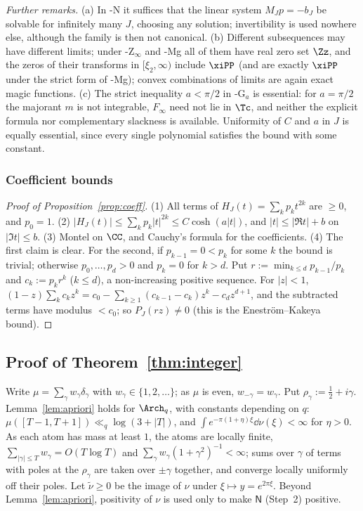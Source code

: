 \emph{Further remarks.} (a) In \hyp{N} it suffices that the linear system $M_Jp=-b_J$ be solvable for infinitely many
$J$, choosing any solution; invertibility is used nowhere else, although the family is then not canonical.
(b) Different subsequences may have different limits; under \hyp{Z$_\infty$} and \hyp{Mg} all of them have real zero set $\Zz$,
and the zeros of their transforms in $[\xi_2,\infty)$ include $\xiPP$ (and are exactly $\xiPP$ under the strict form of \hyp{Mg});
convex combinations of limits are again exact magic functions.
(c) The strict inequality $a<\pi/2$ in \hyp{G$_a$} is essential: for $a=\pi/2$ the majorant $m$ is not integrable, $F_\infty$
need not lie in $\Tc$, and neither the explicit formula nor complementary slackness is available. Uniformity of $C$ and $a$
in $J$ is equally essential, since every single polynomial satisfies the bound with some constant.

\subsubsection{Coefficient bounds}\label{app:proofs-zeroside}
\begin{proof}[Proof of Proposition~\textup{\ref{prop:coeff}}]
(1) All terms of $H_J(t)=\sum_kp_kt^{2k}$ are $\ge0$, and $p_0=1$. (2) $\lvert H_J(t)\rvert\le\sum_kp_k\lvert t\rvert^{2k}\le
C\cosh(a\lvert t\rvert)$, and $\lvert t\rvert\le\lvert\Re t\rvert+b$ on $\lvert\Im t\rvert\le b$. (3) Montel on $\CC$, and Cauchy's formula
for the coefficients. (4) The first claim is clear. For the second, if $p_{k-1}=0<p_k$ for some $k$ the bound is
trivial; otherwise $p_0,\dots,p_d>0$ and $p_k=0$ for $k>d$. Put $r:=\min_{k\le d}p_{k-1}/p_k$ and $c_k:=p_kr^k$
($k\le d$), a non-increasing positive sequence. For $\lvert z\rvert<1$,
$(1-z)\sum_kc_kz^k=c_0-\sum_{k\ge1}(c_{k-1}-c_k)z^k-c_dz^{d+1}$, and the subtracted terms have modulus
$<c_0$; so $P_J(rz)\ne0$ (this is the Enestr\"om--Kakeya bound).
\end{proof}

\subsection{Proof of Theorem~\ref{thm:integer}}\label{app:proofs-integer}

Write $\mu=\sum_\gamma w_\gamma\delta_\gamma$ with $w_\gamma\in\{1,2,\dots\}$; as $\mu$ is even, $w_{-\gamma}=w_\gamma$. Put $\rho_\gamma:=\frac12+i\gamma$.
Lemma~\ref{lem:apriori} holds for $\Arch_q$, with constants depending on $q$: $\mu([T-1,T+1])\ll_q\log(3+|T|)$, and
$\int e^{-\pi(1+\eta)\xi}\dd\nu(\xi)<\infty$ for $\eta>0$. As each atom has mass at least $1$, the atoms are locally finite,
$\sum_{|\gamma|\le T}w_\gamma=O(T\log T)$ and $\sum_\gamma w_\gamma(1+\gamma^2)^{-1}<\infty$; sums over $\gamma$ of terms with poles at the $\rho_\gamma$ are
taken over $\pm\gamma$ together, and converge locally uniformly off their poles. Let $\tilde\nu\ge0$ be the image of $\nu$ under
$\xi\mapsto y=e^{2\pi\xi}$. Beyond Lemma~\ref{lem:apriori}, positivity of $\nu$ is used only to make $\mathsf N$ (Step~2) positive.

